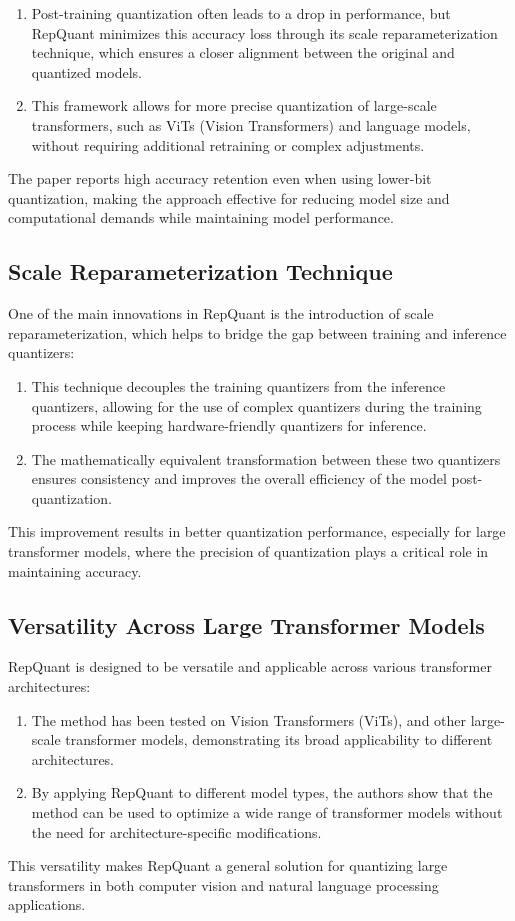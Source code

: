 \documentclass{report}
\begin{document}
	\begin{enumerate}
		\item 
		Post-training quantization often leads to a drop in performance, but RepQuant minimizes this accuracy loss through its scale reparameterization technique, which ensures a closer alignment between the original and quantized models.
		
		\item 
		This framework allows for more precise quantization of large-scale transformers, such as ViTs (Vision Transformers) and language models, without requiring additional retraining or complex adjustments.
	\end{enumerate}
	The paper reports high accuracy retention even when using lower-bit quantization, making the approach effective for reducing model size and computational demands while maintaining model performance.
	
	
	\subsection{Scale Reparameterization Technique}
	One of the main innovations in RepQuant is the introduction of scale reparameterization, which helps to bridge the gap between training and inference quantizers:
	\begin{enumerate}
		\item 
		This technique decouples the training quantizers from the inference quantizers, allowing for the use of complex quantizers during the training process while keeping hardware-friendly quantizers for inference.
		
		\item 
		The mathematically equivalent transformation between these two quantizers ensures consistency and improves the overall efficiency of the model post-quantization.
	\end{enumerate}
	This improvement results in better quantization performance, especially for large transformer models, where the precision of quantization plays a critical role in maintaining accuracy.
	
	
	\subsection{Versatility Across Large Transformer Models}
	RepQuant is designed to be versatile and applicable across various transformer architectures:
	\begin{enumerate}
		\item 
		The method has been tested on Vision Transformers (ViTs), and other large-scale transformer models, demonstrating its broad applicability to different architectures.
		
		\item 
		By applying RepQuant to different model types, the authors show that the method can be used to optimize a wide range of transformer models without the need for architecture-specific modifications.
	\end{enumerate}
	This versatility makes RepQuant a general solution for quantizing large transformers in both computer vision and natural language processing applications.
	
\end{document}
